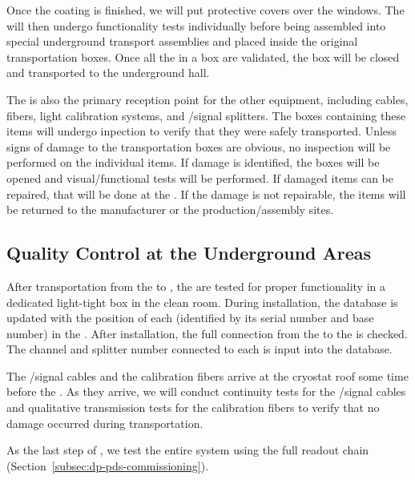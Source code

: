 Once the coating is finished, we will put protective covers over the  windows. The   will then undergo functionality tests individually before being assembled into  special underground transport assemblies and placed inside the original transportation boxes.  Once all the  in a box are validated, the box will be closed and transported to the underground hall. 

The  is also the primary reception point for the other   equipment, including cables, fibers, light calibration systems, and /signal splitters. The boxes containing these items will undergo inpection to verify that %
they were safely transported. Unless signs of  damage to the transportation boxes are obvious, no  inspection will be performed on the individual items. If  damage is identified, the boxes will be opened and visual/functional  tests will be performed. If damaged items can be repaired, that will be done at the . If the damage is not repairable, the items will be returned to the manufacturer or the production/assembly sites.

\subsection{Quality Control at the Underground Areas}

After  transportation from the  to , the  are tested for proper functionality in a dedicated light-tight box in the clean room. During installation, the  database is updated with the position of each  (identified by its serial number and base number) in the . After installation, the full connection from the  to the  is checked. The  channel and splitter number connected to each  is input into the  database.

The /signal cables and the calibration fibers arrive %
at the cryostat roof %
some time before the . %
As they arrive, we will conduct %
continuity tests for the /signal cables and qualitative transmission tests for the calibration fibers to verify that no damage occurred during transportation.

As the last step of , we test the entire system using the full readout chain (Section~\ref{subsec:dp-pds-commissioning}).
